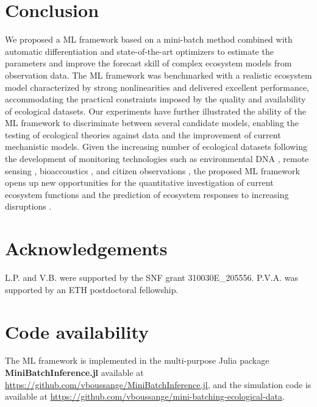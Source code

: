 \section{Conclusion}
We proposed a ML framework based on a mini-batch method combined with automatic differentiation and state-of-the-art optimizers to estimate the parameters and improve the forecast skill of complex ecosystem models from observation data.
% 
The ML framework was benchmarked with a realistic ecosystem model characterized by strong nonlinearities and delivered excellent performance, accommodating the practical constraints imposed by the quality and availability of ecological datasets.  Our experiments have further illustrated the ability of the ML framework to discriminate between several candidate models, enabling the testing of ecological theories against data and the improvement of current mechanistic models.
% 
Given the increasing number of ecological datasets following the development of monitoring technologies such as environmental DNA \cite{Ruppert2019}, remote sensing \cite{Jetz2019}, bioaccoustics \cite{Aide2013}, and citizen observations \cite{GBIF}, the proposed ML framework opens up new opportunities for the quantitative investigation of current ecosystem functions \cite{Curtsdotter2019} and the prediction of ecosystem responses to increasing disruptions \cite{Urban2016}.

\section{Acknowledgements}
L.P. and V.B. were supported by the SNF grant 310030E\_205556. P.V.A. was supported by an ETH postdoctoral fellowship. 

\section{Code availability}
The ML framework is implemented in the multi-purpose Julia package \textbf{MiniBatchInference.jl} available at \href{https://github.com/vboussange/MiniBatchInference.jl}{https://github.com/vboussange/MiniBatchInference.jl}, and the simulation code is available at \href{https://github.com/vboussange/mini-batching-ecological-data}{https://github.com/\linebreak vboussange/mini-batching-ecological-data}.

\printbibliography[heading=subbibliography]